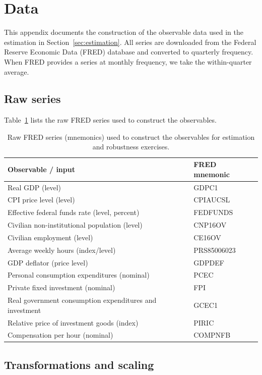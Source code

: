 \section{Data}
\label{app:data}

This appendix documents the construction of the observable data used in the estimation in Section~\ref{sec:estimation}. All series are downloaded from the Federal Reserve Economic Data (FRED) database and converted to quarterly frequency. When FRED provides a series at monthly frequency, we take the within-quarter average.

\subsection{Raw series}
\label{app:data:fred}

Table~\ref{tab:data_fred} lists the raw FRED series used to construct the observables.

\begin{table}[h]
\centering
\caption{Raw FRED series (mnemonics) used to construct the observables for estimation and robustness exercises.}
\label{tab:data_fred}
\begin{tabular}{ll}
\hline\hline
\textbf{Observable / input} & \textbf{FRED mnemonic} \\
\hline
Real GDP (level) & GDPC1 \\
CPI price level (level) & CPIAUCSL \\
Effective federal funds rate (level, percent) & FEDFUNDS \\
Civilian non-institutional population (level) & CNP16OV \\
Civilian employment (level) & CE16OV \\
Average weekly hours (index/level) & PRS85006023 \\
GDP deflator (price level) & GDPDEF \\
Personal consumption expenditures (nominal) & PCEC \\
Private fixed investment (nominal) & FPI \\
Real government consumption expenditures and investment & GCEC1 \\
Relative price of investment goods (index) & PIRIC \\
Compensation per hour (nominal) & COMPNFB \\
\hline
\end{tabular}
\end{table}

\subsection{Transformations and scaling}
\label{app:data:transform}

